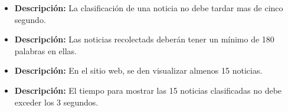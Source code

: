 


    \begin{itemize}
      \item \textbf{Descripción:} La clasificación de una noticia no debe tardar mas de cinco segundo.\\
    \end{itemize}

    \begin{itemize}
     \item \textbf{Descripción:} Las noticias recolectads deberán tener un mínimo de 180 palabras en ellas.\\
    \end{itemize}

    \begin{itemize}
      \item \textbf{Descripción:} En el sitio web, se den visualizar almenos 15 noticias.\\
    \end{itemize}

    \begin{itemize}
      \item \textbf{Descripción:} El tiempo para mostrar las 15 noticias clasificadas no debe exceder los 3 segundos.\\
    \end{itemize}
